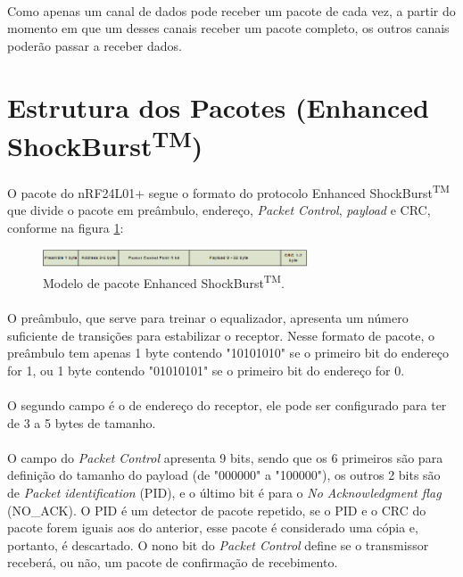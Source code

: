 \paragraph{} Como apenas um canal de dados pode receber um pacote de cada vez, a partir do momento em que um desses canais receber um pacote completo, os outros canais poderão passar a receber dados. 

\section{Estrutura dos Pacotes (Enhanced ShockBurst\textsuperscript{TM})}
\paragraph{} O pacote do nRF24L01+ segue o formato do protocolo Enhanced ShockBurst\textsuperscript{TM} que divide o pacote em preâmbulo, endereço, \textit{Packet Control}, \textit{payload} e CRC, conforme na figura \ref{fig:figura51}: 

\begin{figure}[!ht]
	\centering
	\includegraphics[width=0.7\textwidth]{Figuras/pacote_nrf24.PNG}   
	\caption{Modelo de pacote Enhanced ShockBurst\textsuperscript{TM}.\citep{Nordic2008}}
	\label{fig:figura51}
\end{figure}

\paragraph{} O preâmbulo, que serve para treinar o equalizador, apresenta um número suficiente de transições para estabilizar o receptor. Nesse formato de pacote, o preâmbulo tem apenas 1 byte contendo "10101010" se o primeiro bit do endereço for 1, ou 1 byte contendo "01010101" se o primeiro bit do endereço for 0.

\paragraph{} O segundo campo é o de endereço do receptor, ele pode ser configurado para ter de 3 a 5 bytes de tamanho. 

\paragraph{} O campo do \textit{Packet Control} apresenta 9 bits, sendo que os 6 primeiros são para definição do tamanho do payload (de "000000" a "100000"), os outros 2 bits são de \textit{Packet identification} (PID), e o último bit é para o \textit{No Acknowledgment flag} (NO\_ACK). O PID é um detector de pacote repetido, se o PID e o CRC do pacote forem iguais aos do anterior, esse pacote é considerado uma cópia e, portanto, é descartado. O nono bit do \textit{Packet Control} define se o transmissor receberá, ou não, um pacote de confirmação de recebimento.

